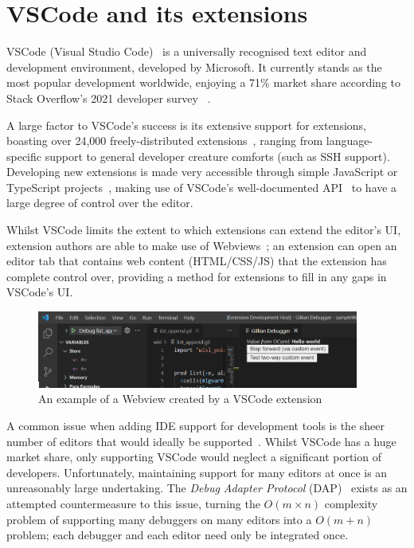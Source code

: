 \section{VSCode and its extensions}
\label{sec:vscode}

VSCode (Visual Studio Code)~\cite{vscode} is a universally recognised text
editor and development environment, developed by Microsoft. It currently stands
as the most popular development worldwide, enjoying a 71\% market share
according to Stack Overflow's 2021 developer survey
~\cite{stack-overflow-survey-editors}.

A large factor to VSCode's success is its extensive support for extensions,
boasting over 24,000 freely-distributed extensions~\cite{vscode-popularity},
ranging from language-specific support to general developer creature comforts
(such as SSH support). Developing new extensions is made very accessible through
simple JavaScript or TypeScript projects~\cite{vscode-extensions-intro}, making
use of VSCode's well-documented API~\cite{vscode-api} to have a large degree of
control over the editor.

Whilst VSCode limits the extent to which extensions can extend the editor's UI,
extension authors are able to make use of Webviews~\cite{vscode-webview}; an
extension can open an editor tab that contains web content (HTML/CSS/JS) that
the extension has complete control over, providing a method for extensions to
fill in any gaps in VSCode's UI.

\begin{figure}
  \center
  \includegraphics[width=400px]{img/webview-example.png}
  \caption{An example of a Webview created by a VSCode extension}
  \label{fig:webview-example}
\end{figure}




A common issue when adding IDE support for development tools is the sheer
number of editors that would ideally be supported~\cite{magpiebridge}. Whilst
VSCode has a huge market share, only supporting VSCode would neglect a
significant portion of developers. Unfortunately, maintaining support for many
editors at once is an unreasonably large undertaking. The \textit{Debug Adapter
Protocol} (DAP)~\cite{dap} exists as an attempted countermeasure to this issue,
turning the $O(m \times n)$ complexity problem of supporting many debuggers on
many editors into a $O(m + n)$ problem; each debugger and each editor need only
be integrated once.

